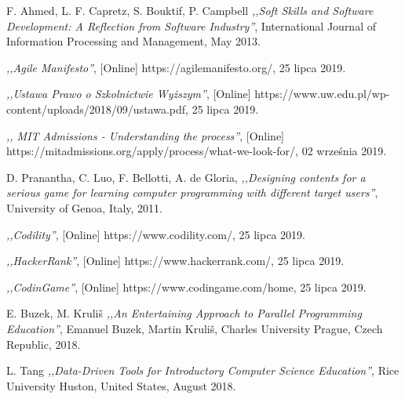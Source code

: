 
\begin{thebibliography}{99}


 F. Ahmed, L. F. Capretz, S. Bouktif, P. Campbell \emph{,,Soft Skills and Software Development: A Reflection from Software Industry''}, International Journal of Information Processing and Management, May 2013.

 \emph{,,Agile Manifesto''}, [Online] https://agilemanifesto.org/, 25 lipca 2019.

 \emph{,,Ustawa Prawo o Szkolnictwie Wyższym''}, [Online] https://www.uw.edu.pl/wp-content/uploads/2018/09/ustawa.pdf, 25 lipca 2019.

 \emph{,, MIT Admissions - Understanding the process''}, [Online] https://mitadmissions.org/apply/process/what-we-look-for/, 02 września 2019.

 D. Pranantha, C. Luo, F. Bellotti, A. de Gloria,  \emph{,,Designing contents for a serious game for learning computer programming with different target users''}, University of Genoa, Italy, 2011.

 \emph{,,Codility''}, [Online] https://www.codility.com/, 25 lipca 2019.

 \emph{,,HackerRank''}, [Online] https://www.hackerrank.com/, 25 lipca 2019.

 \emph{,,CodinGame''}, [Online] https://www.codingame.com/home, 25 lipca 2019.

 E. Buzek, M. Kruliš \emph{,,An Entertaining Approach to Parallel Programming Education''}, Emanuel Buzek, Martin Kruliš, Charles University Prague, Czech Republic, 2018.

 L. Tang \emph{,,Data-Driven Tools for Introductory Computer Science Education''}, Rice University Huston, United States, August 2018.


\end{thebibliography}

